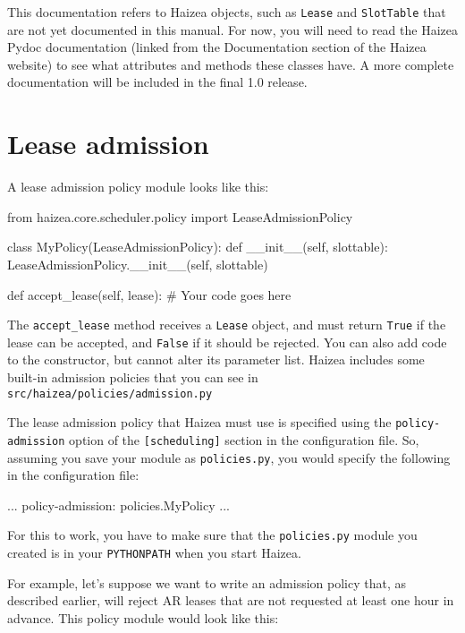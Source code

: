 \begin{warning}
This documentation refers to Haizea objects, such as \texttt{Lease} and \texttt{SlotTable} that are not yet documented in this manual. For now, you will need to read the Haizea Pydoc documentation (linked from the Documentation section of the Haizea website) to see what attributes and methods these classes have. A more complete documentation will be included in the final 1.0 release.
\end{warning}

\section{Lease admission}

A lease admission policy module looks like this:

\begin{wideshellverbatim}
from haizea.core.scheduler.policy import LeaseAdmissionPolicy

class MyPolicy(LeaseAdmissionPolicy):
    def __init__(self, slottable):
        LeaseAdmissionPolicy.__init__(self, slottable)
        
    def accept_lease(self, lease):
        # Your code goes here
\end{wideshellverbatim}

The \texttt{accept\_lease} method receives a \texttt{Lease} object, and must return \texttt{True} if the lease can be accepted, and \texttt{False} if it should be rejected. You can also add code to the constructor, but cannot alter its parameter list. Haizea includes some built-in admission policies that you can see in \texttt{src/haizea/policies/admission.py}

The lease admission policy that Haizea must use is specified using the \texttt{policy-admission} option of the \texttt{[scheduling]} section in the configuration file. So, assuming you save your module as \texttt{policies.py}, you would specify the following in the configuration file:

\begin{wideshellverbatim}
[scheduling]
...
policy-admission: policies.MyPolicy
...
\end{wideshellverbatim}

For this to work, you have to make sure that the \texttt{policies.py} module you created is in your \texttt{PYTHONPATH} when you start Haizea.

For example, let's suppose we want to write an admission policy that, as described earlier, will reject AR leases that are not requested at least one hour in advance. This policy module would look like this:

